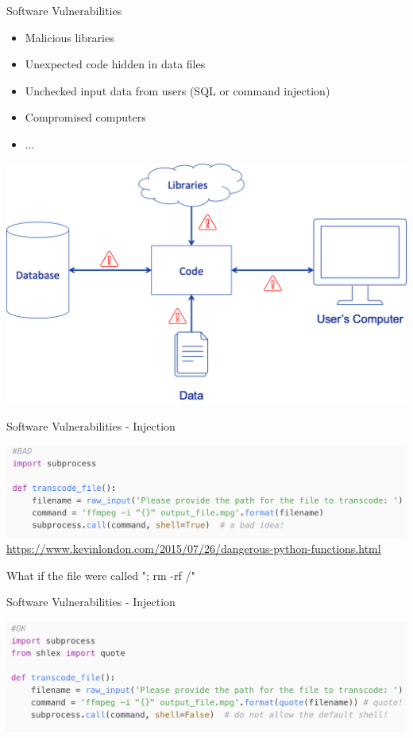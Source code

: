 \documentclass{beamer}
\begin{document}
\begin{frame}{Software Vulnerabilities}
\begin{itemize}
\item Malicious libraries
\item Unexpected code hidden in data files
\item Unchecked input data from users (SQL or command injection)
\item Compromised computers
\item ... 
\end{itemize}
\begin{center}
\includegraphics[width=0.4\linewidth]{software-vulnerabilities-red.png}
\end{center}
\end{frame}

\begin{frame}{{\color{red}Software Vulnerabilities - Injection}}
\begin{center}
\includegraphics[width=1\linewidth]{bad-injection.png}\newline
{\tiny \url{https://www.kevinlondon.com/2015/07/26/dangerous-python-functions.html}}
\end{center}
What if the file were called "; rm -rf /"
\end{frame}

\begin{frame}{{\color{red}Software Vulnerabilities - Injection}}
\begin{center}
\includegraphics[width=1\linewidth]{good-injection.png}\newline
\end{center}
\end{frame}
\end{document}
